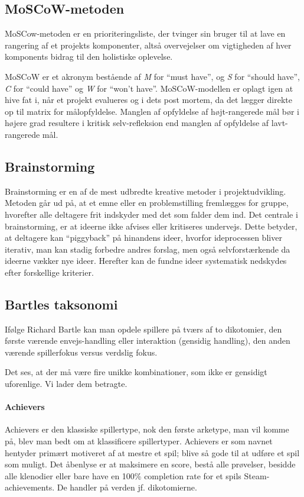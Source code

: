 \subsection{MoSCoW-metoden}\label{sec:moscowmetode}
MoSCow-metoden er en prioriteringsliste, der tvinger sin bruger til at lave en rangering af et projekts komponenter, altså overvejelser om vigtigheden af hver komponents bidrag til den holistiske oplevelse.

MoSCoW er et akronym bestående af \textit{M} for ``must have'', og \textit{S} for ``should have'', \textit{C} for ``could have'' og \textit{W} for ``won't have''. MoSCoW-modellen er oplagt igen at hive fat i, når et projekt evalueres og i dets post mortem, da det lægger direkte op til matrix for målopfyldelse. Manglen af opfyldelse af højt-rangerede mål bør i højere grad resultere i kritisk selv-refleksion end manglen af opfyldelse af lavt-rangerede mål.

\subsection{Brainstorming}
Brainstorming er en af de mest udbredte kreative metoder i projektudvikling. Metoden går ud på, at et emne eller en problemstilling fremlægges for gruppe, hvorefter alle deltagere frit indskyder med det som falder dem ind. Det centrale i brainstorming, er at ideerne ikke afvises eller kritiseres undervejs. Dette betyder, at deltagere kan ``piggyback'' på hinandens ideer, hvorfor ideprocessen bliver iterativ, man kan stadig forbedre andres forslag, men også selvforstærkende da ideerne vækker nye ideer. Herefter kan de fundne ideer systematisk nedskydes efter forskellige kriterier.

\subsection{Bartles taksonomi}\label{sec:bartletax}
Ifølge Richard Bartle kan man opdele spillere på tværs af to dikotomier, den første værende envejs-handling eller interaktion (gensidig handling), den anden værende spillerfokus versus verdslig fokus.

Det ses, at der må være fire unikke kombinationer, som ikke er gensidigt uforenlige. Vi lader dem betragte.
\paragraph{Achievers}
Achievers er den klassiske spillertype, nok den første arketype, man vil komme på, blev man bedt om at klassificere spillertyper. Achievers er som navnet hentyder primært motiveret af at mestre et spil; blive så gode til at udføre et spil som muligt. Det åbenlyse er at maksimere en score, bestå alle prøvelser, besidde alle klenodier eller bare have en 100\% completion rate for et spils Steam-achievements. De handler på verden jf. dikotomierne.
